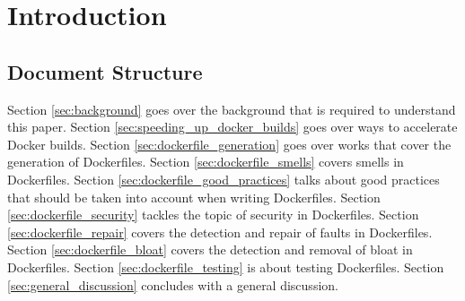 \chapter{Introduction} \label{chap:intro}

\section{Document Structure}

Section \ref{sec:background} goes over the background that is required to understand this paper. Section \ref{sec:speeding_up_docker_builds} goes over ways to accelerate Docker builds. Section \ref{sec:dockerfile_generation} goes over works that cover the generation of Dockerfiles. Section \ref{sec:dockerfile_smells} covers smells in Dockerfiles. Section \ref{sec:dockerfile_good_practices} talks about good practices that should be taken into account when writing Dockerfiles. Section \ref{sec:dockerfile_security} tackles the topic of security in Dockerfiles. Section \ref{sec:dockerfile_repair} covers the detection and repair of faults in Dockerfiles. Section \ref{sec:dockerfile_bloat} covers the detection and removal of bloat in Dockerfiles. Section \ref{sec:dockerfile_testing} is about testing Dockerfiles. Section \ref{sec:general_discussion} concludes with a general discussion.







